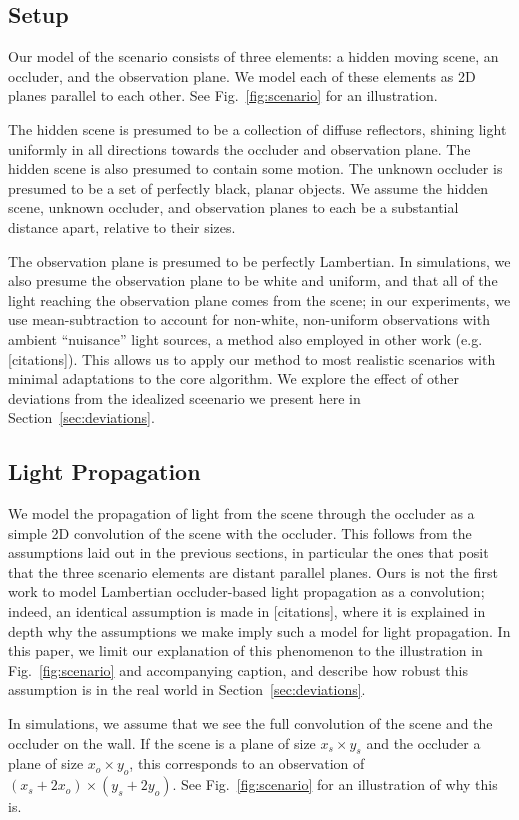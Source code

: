 \subsection{Setup}

Our model of the scenario consists of three elements: a hidden moving scene, an occluder, and the observation plane. We model each of these elements as 2D planes parallel to each other. See Fig.~\ref{fig:scenario} for an illustration. 

The hidden scene is presumed to be a collection of diffuse reflectors, shining light uniformly in all directions towards the occluder and observation plane. The hidden scene is also presumed to contain some motion. The unknown occluder is presumed to be a set of perfectly black, planar objects. We assume the hidden scene, unknown occluder, and observation planes to each be a substantial distance apart, relative to their sizes.

The observation plane is presumed to be perfectly Lambertian. In simulations, we also presume the observation plane to be white and uniform, and that all of the light reaching the observation plane comes from the scene; in our experiments, we use mean-subtraction to account for non-white, non-uniform observations with ambient ``nuisance'' light sources, a method also employed in other work (e.g. [citations]). This allows us to apply our method to most realistic scenarios with minimal adaptations to the core algorithm. We explore the effect of other deviations from the idealized sceenario we present here in Section~\ref{sec:deviations}. 

\subsection{Light Propagation}

We model the propagation of light from the scene through the occluder as a simple 2D convolution of the scene with the occluder. This follows from the assumptions laid out in the previous sections, in particular the ones that posit that the three scenario elements are distant parallel planes. Ours is not the first work to model Lambertian occluder-based light propagation as a convolution; indeed, an identical assumption is made in [citations], where it is explained in depth why the assumptions we make imply such a model for light propagation. In this paper, we limit our explanation of this phenomenon to the illustration in Fig.~\ref{fig:scenario} and accompanying caption, and describe how robust this assumption is in the real world in Section~\ref{sec:deviations}.

In simulations, we assume that we see the full convolution of the scene and the occluder on the wall. If the scene is a plane of size $x_s \times y_s$ and the occluder a plane of size $x_o \times y_o$, this corresponds to an observation of $(x_s + 2x_o) \times (y_s + 2y_o)$. See Fig.~\ref{fig:scenario} for an illustration of why this is.





